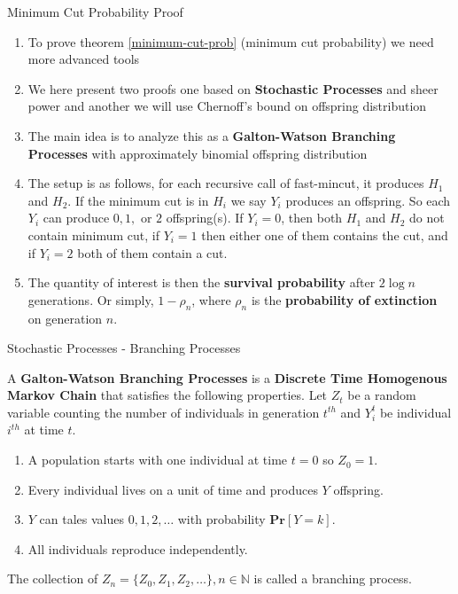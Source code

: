 \begin{frame}{Minimum Cut Probability Proof}
    \begin{enumerate}
        \item To prove theorem \ref{minimum-cut-prob} (minimum cut probability) we need more advanced tools
        \item We here present two proofs one based on \textbf{Stochastic Processes} and sheer power and another we will use Chernoff's bound on offspring distribution
        \item The main idea is to analyze this as a \textbf{Galton-Watson Branching Processes} with approximately binomial offspring distribution
        \item The setup is as follows, for each recursive call of fast-mincut, it produces $H_1$ and $H_2$. If the minimum cut is in $H_i$ we say $Y_i$ produces an offspring. So each $Y_i$ can produce $0, 1,$ or $2$ offspring(s). If $Y_i = 0$, then both $H_1$ and $H_2$ do not contain minimum cut, if $Y_i = 1$ then either one of them contains the cut, and if $Y_i = 2$ both of them contain a cut.
        \item The quantity of interest is then the \textbf{survival probability} after $2\log{n}$ generations. Or simply, $1 - \rho_n$, where $\rho_n$ is the \textbf{probability of extinction} on generation $n$.
    \end{enumerate}
\end{frame}

\begin{frame}{Stochastic Processes - Branching Processes}
    \begin{definition}
        A \textbf{Galton-Watson Branching Processes} is a \textbf{Discrete Time Homogenous Markov Chain} that satisfies the following properties. Let $Z_t$ be a random variable counting the number of individuals in generation $t^{th}$ and $Y_i^t$ be individual $i^{th}$ at time $t$. 
        \begin{enumerate}
            \item A population starts with one individual at time $t = 0$ so $Z_0 = 1$.
            \item Every individual lives on a unit of time and produces $Y$ offspring.
            \item $Y$ can tales values $0, 1, 2, \hdots$ with probability $\textbf{Pr}[Y = k]$.
            \item All individuals reproduce independently.
        \end{enumerate}
        The collection of $Z_n = \lbrace Z_0, Z_1, Z_2, \hdots \rbrace, n \in \mathbb{N}$ is called a branching process.
    \end{definition}
\end{frame}


